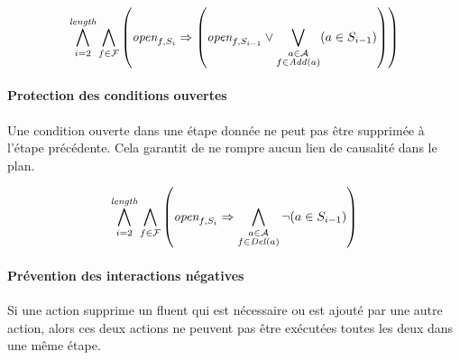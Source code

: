 
\begin{small}
\[
\bigwedge\limits_{\substack{i=2}}^{\textit{length}}\bigwedge\limits_{\substack{\substack{f\in \mathcal{F}}}}\left(\textit{open}_{f,S_{i}} \Rightarrow \left(\textit{open}_{f,S_{i-1}} \vee \bigvee\limits_{\substack{\substack{a\in \mathcal{A}\\f \in \mathit{Add}(a)}}}(a \in S_{i - 1})\right)\right)
\]
\end{small}



\paragraph*{Protection des conditions ouvertes}

Une condition ouverte dans une étape donnée ne peut pas être supprimée à l'étape précédente. Cela garantit de ne rompre aucun lien de causalité dans le plan.


\begin{small}
\[
\bigwedge\limits_{\substack{i=2}}^{\textit{length}}\bigwedge\limits_{\substack{\substack{f\in \mathcal{F}}}}\left(\textit{open}_{f,S_{i}} \Rightarrow \bigwedge\limits_{\substack{\substack{a\in \mathcal{A}\\f \in \mathit{Del}(a)}}}\neg (a \in S_{i - 1})\right)
\]
\end{small}

\paragraph*{Prévention des interactions négatives}

Si une action supprime un fluent qui est nécessaire ou est ajouté par une autre action, alors ces deux actions ne peuvent pas être exécutées toutes les deux dans une même étape.

